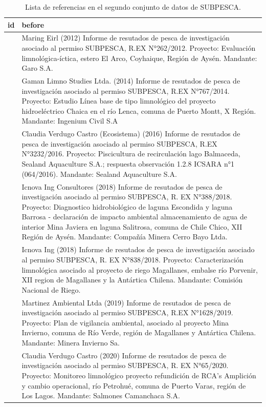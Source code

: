\documentclass[sn-apa,pdflatex]{sn-jnl}
\begin{document}
\begin{longtable}[t]{>{\raggedleft\arraybackslash}p{4em}>{\raggedright\arraybackslash}p{50em}}
\caption{\label{tab:subpescareftable}Lista de referencias en el segundo conjunto de datos de SUBPESCA.}\\
\toprule
id & before\\
\midrule
1 & Maring Eirl (2012) Informe de resutados de pesca de investigación asociado al permiso SUBPESCA, R.EX N°262/2012. Proyecto: Evaluación limnológica-íctica, estero El Arco, Coyhaique, Región de Aysén. Mandante: Garo S.A.\\
2 & Gaman Limno Studies Ltda. (2014) Informe de resutados de pesca de investigación asociado al permiso SUBPESCA, R.EX N°767/2014. Proyecto: Estudio Línea base de tipo limnológico del proyecto hidroeléctrico Chaica en el río Lenca, comuna de Puerto Montt, X Región. Mandante: Ingenium Civil S.A\\
3 & Claudia Verdugo Castro (Ecosistema) (2016) Informe de resutados de pesca de investigación asociado al permiso SUBPESCA, R.EX N°3232/2016. Proyecto: Piscicultura de recirculación lago Balmaceda, Sealand Aquaculture S.A.; respuesta observación 1.2.8 ICSARA n°1 (064/2016). Mandante: Sealand Aquaculture S.A.\\
4 & Icnova Ing Consultores (2018) Informe de resutados de pesca de investigación asociado al permiso SUBPESCA, R. EX N°388/2018. Proyecto: Diagnostico hidrobiológico de laguna Escondida y laguna Barrosa - declaración de impacto ambiental almacenamiento de agua de interior Mina Javiera en laguna Salitrosa, comuna de Chile Chico, XII Región de Aysén. Mandante: Compañía Minera Cerro Bayo Ltda.\\
5 & Icnova Ing (2018) Informe de resutados de pesca de investigación asociado al permiso SUBPESCA, R. EX N°838/2018. Proyecto: Caracterización limnológica asociado al proyecto de riego Magallanes, embalse río Porvenir, XII region de Magallanes y la Antártica Chilena. Mandante: Comisión Nacional de Riego.\\
\addlinespace
6 & Martinez Ambiental Ltda (2019) Informe de resutados de pesca de investigación asociado al permiso SUBPESCA, R.EX N°1628/2019. Proyecto: Plan de vigilancia ambiental, asociado al proyecto Mina Invierno, comuna de Río Verde, región de Magallanes y Antártica Chilena. Mandante: Minera Invierno Sa.\\
7 & Claudia Verdugo Castro (2020) Informe de resutados de pesca de investigación asociado al permiso SUBPESCA, R. EX N°65/2020. Proyecto: Monitoreo limnológico proyecto refundición de RCA's Amplición y cambio operacional, río Petrohué, comuna de Puerto Varas, región de Los Lagos. Mandante: Salmones Camanchaca S.A.\\

\end{longtable}
\end{document}
